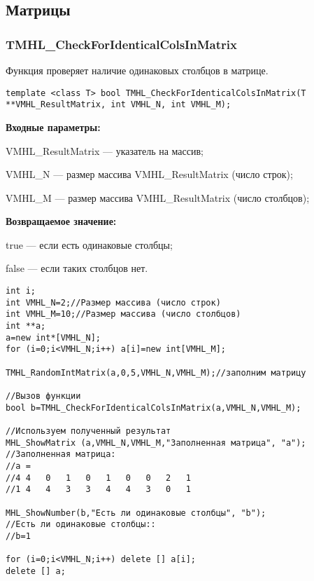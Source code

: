 \documentclass[a4paper,12pt]{article}
\begin{document}
\subsection{Матрицы}

\subsubsection{TMHL\_CheckForIdenticalColsInMatrix}\label{TMHL_CheckForIdenticalColsInMatrix}

Функция проверяет наличие одинаковых столбцов в матрице.


\begin{lstlisting}[label=code_syntax_TMHL_CheckForIdenticalColsInMatrix,caption=Синтаксис]
template <class T> bool TMHL_CheckForIdenticalColsInMatrix(T **VMHL_ResultMatrix, int VMHL_N, int VMHL_M);
\end{lstlisting}

\textbf{Входные параметры:}
 
VMHL\_ResultMatrix --- указатель на массив;
 
VMHL\_N --- размер массива VMHL\_ResultMatrix (число строк);
 
VMHL\_M --- размер массива VMHL\_ResultMatrix (число столбцов);

\textbf{Возвращаемое значение:}

 true --- если есть одинаковые столбцы;
 
 false --- если таких столбцов нет.


\begin{lstlisting}[label=code_use_TMHL_CheckForIdenticalColsInMatrix,caption=Пример использования]
int i;
int VMHL_N=2;//Размер массива (число строк)
int VMHL_M=10;//Размер массива (число столбцов)
int **a;
a=new int*[VMHL_N];
for (i=0;i<VMHL_N;i++) a[i]=new int[VMHL_M];

TMHL_RandomIntMatrix(a,0,5,VMHL_N,VMHL_M);//заполним матрицу

//Вызов функции
bool b=TMHL_CheckForIdenticalColsInMatrix(a,VMHL_N,VMHL_M);

//Используем полученный результат
MHL_ShowMatrix (a,VMHL_N,VMHL_M,"Заполненная матрица", "a");
//Заполненная матрица:
//a =
//4	4	0	1	0	1	0	0	2	1
//1	4	4	3	3	4	4	3	0	1

MHL_ShowNumber(b,"Есть ли одинаковые столбцы", "b");
//Есть ли одинаковые столбцы::
//b=1

for (i=0;i<VMHL_N;i++) delete [] a[i];
delete [] a;
\end{lstlisting}
\end{document}
